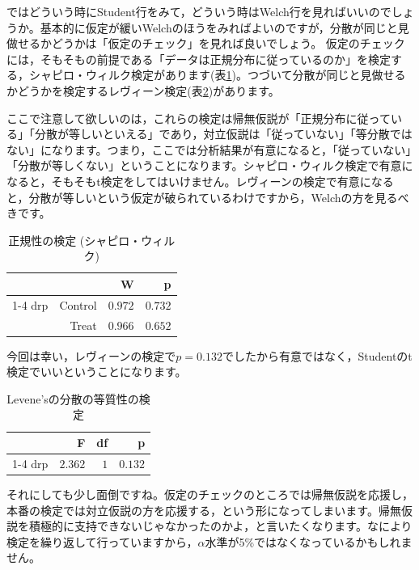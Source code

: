 \documentclass{ltjbook}
\begin{document}
ではどういう時にStudent行をみて，どういう時はWelch行を見ればいいのでしょうか。基本的に仮定が緩いWelchのほうをみればよいのですが，分散が同じと見做せるかどうかは「仮定のチェック」を見れば良いでしょう。
仮定のチェックには，そもそもの前提である「データは正規分布に従っているのか」を検定する，シャピロ・ウィルク検定があります(表\ref{tab:Shapiro-Wilk})。つづいて分散が同じと見做せるかどうかを検定するレヴィーン検定(表\ref{tab:levene})があります。

ここで注意して欲しいのは，これらの検定は帰無仮説が「正規分布に従っている」「分散が等しいといえる」であり，対立仮説は「従っていない」「等分散ではない」になります。つまり，ここでは分析結果が有意になると，「従っていない」「分散が等しくない」ということになります。シャピロ・ウィルク検定で有意になると，そもそもt検定をしてはいけません。レヴィーンの検定で有意になると，分散が等しいという仮定が破られているわけですから，Welchの方を見るべきです。

\begin{table}[ht]
	\centering
	\caption{正規性の検定 (シャピロ・ウィルク)}
	\label{tab:Shapiro-Wilk}
	{
		\begin{tabular}{lrrr}
			\toprule
			    &         & W       & p       \\
			\cmidrule[0.4pt]{1-4}
			drp & Control & $0.972$ & $0.732$ \\
			$ $ & Treat   & $0.966$ & $0.652$ \\
			\bottomrule
		\end{tabular}
	}
\end{table}
今回は幸い，レヴィーンの検定で$p=0.132$でしたから有意ではなく，Studentのt検定でいいということになります。
\begin{table}[ht]
	\centering
	\caption{Levene'sの分散の等質性の検定}
	\label{tab:levene}
	{
		\begin{tabular}{lrrr}
			\toprule
			    & F       & df  & p       \\
			\cmidrule[0.4pt]{1-4}
			drp & $2.362$ & $1$ & $0.132$ \\
			\bottomrule
		\end{tabular}
	}
\end{table}
それにしても少し面倒ですね。仮定のチェックのところでは帰無仮説を応援し，本番の検定では対立仮説の方を応援する，という形になってしまいます。帰無仮説を積極的に支持できないじゃなかったのかよ，と言いたくなります。なにより検定を繰り返して行っていますから，$\alpha$水準が5\%ではなくなっているかもしれません。
\end{document}
